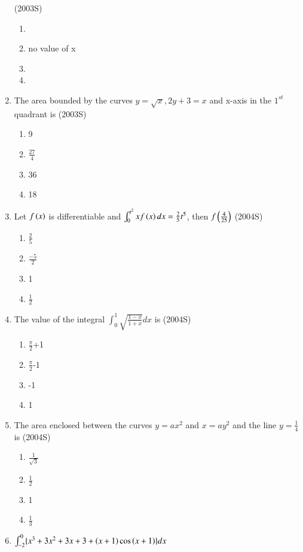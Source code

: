\documentclass[journal,12pt,twocolumn]{IEEEtran}
\theoremstyle{remark}
\begin{document}
\begin{enumerate}
	\hfill(2003S)
\begin{enumerate}
    \item {}
    \item no value of x
    \item {}
    \item {}
\end{enumerate}
  \item The area bounded by the curves $ y=\sqrt{x},2y+3=x$  and x-axis in the $1^{st}$ quadrant is
	  \hfill(2003S)
\begin{enumerate}
    \item 9
    \item $\frac{27}{4}$
    \item 36
    \item 18
\end{enumerate}
 \item Let $f\left(x\right)$ is differentiable and $\int_{0}^{t^{2}}xf\left(x\right)dx=\frac{2}{5}t^{5}$, then $f\left(\frac{4}{25}\right)$
	 \hfill(2004S)
 \begin{enumerate}
	 \item $\frac{2}{5}$
	 \item $\frac{-5}{2}$
     \item 1
     \item $\frac{1}{2}$
 \end{enumerate}
 \item The value of the integral $\int_{0}^{1}\sqrt{\frac{1-x}{1+x}}dx$ is
	 \hfill(2004S)
\begin{enumerate}
 \item $\frac{\pi}{2}$+1
 \item $\frac{\pi}{2}$-1
 \item -1
 \item 1
 \end{enumerate}
 \item The area enclosed between the curves $y=ax^{2}$ and $x=ay^{2}$ and the line $y=\frac{1}{4}$ is
	 \hfill(2004S)
 \begin{enumerate}
	 \item $\frac{1}{\sqrt{3}}$
	 \item $\frac{1}{2}$
     \item 1
     \item $\frac{1}{3}$
 \end{enumerate}
 \item $\int_{-2}^{0}\{x^{3}+3x^{2}+3x+3+\left(x+1\right)\cos\left(x+1\right)\}dx$
 

\end{enumerate}
\end{document}
